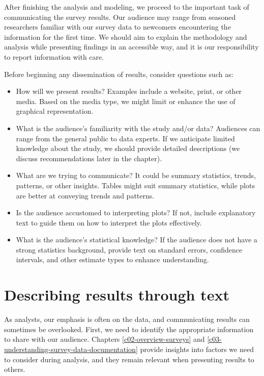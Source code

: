 \documentclass[
]{krantz}
\providecommand{\tightlist}{%
  \setlength{\itemsep}{0pt}\setlength{\parskip}{0pt}}
\begin{document}
After finishing the analysis and modeling, we proceed to the important task of communicating the survey results. Our audience may range from seasoned researchers familiar with our survey data to newcomers encountering the information for the first time. We should aim to explain the methodology and analysis while presenting findings in an accessible way, and it is our responsibility to report information with care.

Before beginning any dissemination of results, consider questions such as:

\begin{itemize}
\tightlist
\item
  How will we present results? Examples include a website, print, or other media. Based on the media type, we might limit or enhance the use of graphical representation.
\item
  What is the audience's familiarity with the study and/or data? Audiences can range from the general public to data experts. If we anticipate limited knowledge about the study, we should provide detailed descriptions (we discuss recommendations later in the chapter).
\item
  What are we trying to communicate? It could be summary statistics, trends, patterns, or other insights. Tables might suit summary statistics, while plots are better at conveying trends and patterns.
\item
  Is the audience accustomed to interpreting plots? If not, include explanatory text to guide them on how to interpret the plots effectively.
\item
  What is the audience's statistical knowledge? If the audience does not have a strong statistics background, provide text on standard errors, confidence intervals, and other estimate types to enhance understanding.
\end{itemize}

\hypertarget{describing-results-through-text}{%
\section{Describing results through text}\label{describing-results-through-text}}

As analysts, our emphasis is often on the data, and communicating results can sometimes be overlooked. First, we need to identify the appropriate information to share with our audience. Chapters \ref{c02-overview-surveys} and \ref{c03-understanding-survey-data-documentation} provide insights into factors we need to consider during analysis, and they remain relevant when presenting results to others.
\end{document}

